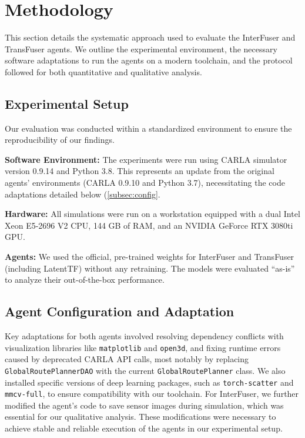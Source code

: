 \section{Methodology}
\label{sec:methodology}

This section details the systematic approach used to evaluate the InterFuser and TransFuser agents. We outline the experimental environment, the necessary software adaptations to run the agents on a modern toolchain, and the protocol followed for both quantitative and qualitative analysis.

\subsection{Experimental Setup}
\label{subsec:setup}

Our evaluation was conducted within a standardized environment to ensure the reproducibility of our findings.

\noindent\textbf{Software Environment:} The experiments were run using CARLA simulator version 0.9.14 and Python 3.8. This represents an update from the original agents' environments (CARLA 0.9.10 and Python 3.7), necessitating the code adaptations detailed below (\autoref{subsec:config}.

\noindent\textbf{Hardware:} All simulations were run on a workstation equipped with a dual Intel Xeon E5-2696 V2 CPU, 144 GB of RAM, and an NVIDIA GeForce RTX 3080ti GPU.

\noindent\textbf{Agents:} We used the official, pre-trained weights for InterFuser and TransFuser (including LatentTF) without any retraining. The models were evaluated ``as-is'' to analyze their out-of-the-box performance.

\subsection{Agent Configuration and Adaptation}
\label{subsec:config}

Key adaptations for both agents involved resolving dependency conflicts with visualization libraries like \texttt{matplotlib} and \texttt{open3d}, and fixing runtime errors caused by deprecated CARLA API calls, most notably by replacing \texttt{GlobalRoutePlannerDAO} with the current \texttt{GlobalRoutePlanner} class. We also installed specific versions of deep learning packages, such as \texttt{torch-scatter} and \texttt{mmcv-full}, to ensure compatibility with our toolchain. For InterFuser, we further modified the agent's code to save sensor images during simulation, which was essential for our qualitative analysis. These modifications were necessary to achieve stable and reliable execution of the agents in our experimental setup.


